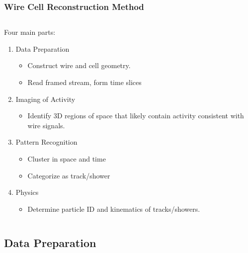 \documentclass[xcolor=dvipsnames]{beamer}
\begin{document}
\begin{frame}[fragile]
  \frametitle{Wire Cell Reconstruction Method}
  \begin{columns}
    \begin{column}{0.7\textwidth}
      Four main parts:
      \begin{enumerate}
      \item<2> Data Preparation
        \begin{itemize}        \scriptsize
        \item Construct wire and cell geometry.
        \item Read framed stream, form time slices
        \end{itemize}
      \item<3> Imaging of Activity
        \begin{itemize}        \scriptsize
        \item Identify 3D regions of space that likely contain
          activity consistent with wire signals.
        \end{itemize}
      \item<4> Pattern Recognition 
        \begin{itemize}         \scriptsize
        \item Cluster in space and time
        \item Categorize as track/shower
        \end{itemize}
      \item<5> Physics
        \begin{itemize}
        \item Determine particle ID and kinematics of tracks/showers.
        \end{itemize}
      \end{enumerate}
    \end{column}
    \begin{column}{0.3\textwidth}
      \begin{center}
        \vspace{-10mm}
        \resizebox{!}{\textheight}{}
      \end{center}
    \end{column}
  \end{columns}

\end{frame}

\subsection{Data Preparation}
\end{document}
